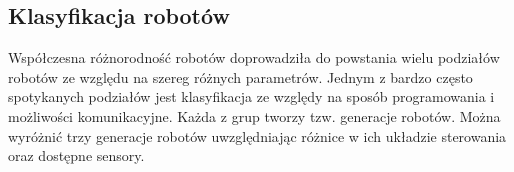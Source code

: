 \subsection{Klasyfikacja robotów}
Współczesna różnorodność robotów doprowadziła do powstania wielu podziałów
robotów ze względu na szereg różnych parametrów. Jednym z bardzo często
spotykanych podziałów jest klasyfikacja ze względy na sposób programowania i
możliwości komunikacyjne. Każda z grup tworzy tzw. generacje robotów. Można
wyróżnić trzy generacje robotów uwzględniając różnice w ich układzie sterowania
oraz dostępne sensory\cite{website:robotyka-pl}.
